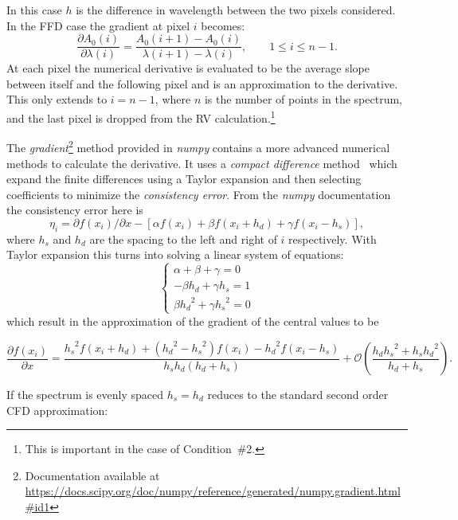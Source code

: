 {In this case \(h\) is the difference in wavelength between the two pixels considered.
In the {FFD} case the gradient at pixel \(i\) becomes:
\begin{equation}
\frac{\partial A_0(i)}{\partial\lambda(i)} = \frac{A_0(i+1) - A_0(i)}{\lambda(i+1)-\lambda(i)}, \hspace{2em} 1 \leq i \leq n-1.
\label{eqn:ffd_precision}
\end{equation}
At each pixel the numerical derivative is evaluated to be the average slope between itself and the following pixel and is an approximation to the derivative.
This only extends to \(i= n-1\), where \(n\) is the number of points in the spectrum, and the last pixel is dropped from the {RV} calculation.\footnote{This is important in the case of Condition~\#2.}


The \emph{gradient}\footnote{Documentation available at \href{https://docs.scipy.org/doc/numpy/reference/generated/numpy.gradient.html\#id1 }{https://docs.scipy.org/doc/numpy/reference/generated/numpy.gradient.html\#id1}}  method provided in \emph{numpy} contains a more advanced numerical methods to calculate the derivative.
It uses a \textit{compact difference} method~\citep{quarteroni_numerical_2000} which expand the finite differences using a Taylor expansion and then selecting coefficients to minimize the \textit{consistency error}.
From the \emph{numpy} documentation the consistency error here is \[\eta_i = \partial{f(x_i)}/\partial{x} -  [\alpha f(x_i) + \beta f(x_i +h_d) + \gamma f(x_i - h_s)],\] where \(h_s\) and \(h_d\) are the spacing to the left and right of \(i\) respectively.
With Taylor expansion this turns into solving a linear system of equations:
\[\begin{cases}
         \alpha + \beta + \gamma = 0\\
         -\beta {h_d} + \gamma {h_s} = 1\\
         \beta {h_{d}}^{2} + \gamma {h_{s}}^{2} = 0
    \end{cases}
\]
which result in the approximation of the gradient of the central values to be

\[\frac{\partial{f(x_i)}}{\partial{x}} = \frac{{h_{s}}^{2}f\left(x_{i} + {h_{d}}\right) + \left({h_{d}}^{2} - {h_{s}}^{2}\right)f\left(x_{i}\right) - {h_{d}}^{2}f\left(x_{i}-{h_{s}}\right)} {{h_{s}}{h_{d}}\left({h_{d}} + {h_{s}}\right)} + \mathcal{O}\left(\frac{h_{d}{h_{s}}^{2} + {h_{s}}{h_{d}}^{2}}{{h_{d}} + {h_{s}}}\right) \label{full_compact_difference}.\]

If the spectrum is evenly spaced ${h_{s}}={h_{d}}$  reduces to the standard second order {CFD} approximation:

}
